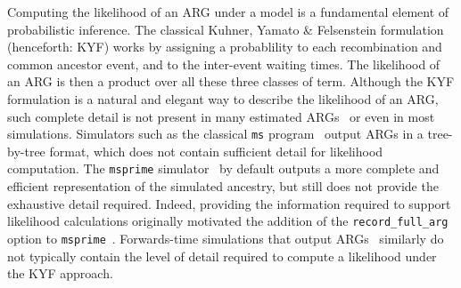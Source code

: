 \documentclass{article}
\begin{document}
Computing the likelihood of an ARG under a model is a fundamental element of
probabilistic inference. The classical Kuhner, Yamato \& Felsenstein
\citeyearpar{kuhner_maximum_2000} formulation (henceforth: KYF)
works by assigning a probablility to each recombination and common
ancestor event, and to the inter-event  waiting times. The likelihood of an 
ARG is then a product over all these three classes of term.
Although the KYF formulation is a natural and elegant way to describe 
the likelihood of an ARG, such complete detail is not present 
in many estimated ARGs~\citep{wong_general_2023} or even in most simulations.
Simulators such as the classical \texttt{ms}
program~\citep{hudson_generating_2002} output ARGs in a tree-by-tree format,
which does not contain sufficient detail for likelihood computation.
The \texttt{msprime}
simulator~\citep{kelleher_efficient_2016,baumdicker_efficient_2021} 
by default outputs a more complete and efficient representation of 
the simulated ancestry, but still does not provide the exhaustive
detail required.
Indeed, providing the information required to 
support likelihood calculations originally motivated the addition of
the \texttt{record\_full\_arg}
option to \texttt{msprime}~\citep{baumdicker_efficient_2021}.
Forwards-time simulations that output 
ARGs~\citep{kelleher_efficient_2018,haller_tree_2018} similarly do not
typically contain the level of detail required to compute a likelihood under
the KYF approach.

\end{document}
